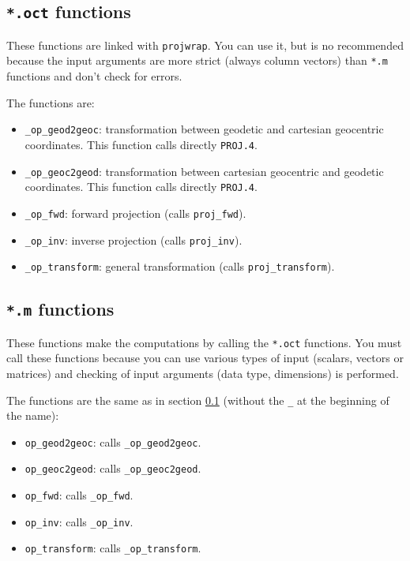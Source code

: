 \documentclass[10pt,a4paper]{article}
\newcommand{\proj}{\texttt{PROJ.4}}
\begin{document}
\subsection{\texttt{*.oct} functions}
\label{op-of}

These functions are linked with \texttt{projwrap}. You can use it, but is no
recommended because the input arguments are more strict (always column vectors)
than \texttt{*.m} functions and don't check for errors.

The functions are:
\begin{itemize}
\item \texttt{\_op\_geod2geoc}: transformation between geodetic and cartesian
      geocentric coordinates. This function calls directly \proj.
\item \texttt{\_op\_geoc2geod}: transformation between cartesian geocentric
      and geodetic coordinates. This function calls directly \proj.
\item \texttt{\_op\_fwd}: forward projection (calls \texttt{proj\_fwd}).
\item \texttt{\_op\_inv}: inverse projection (calls \texttt{proj\_inv}).
\item \texttt{\_op\_transform}: general transformation (calls
      \texttt{proj\_transform}).
\end{itemize}

\subsection{\texttt{*.m} functions}

These functions make the computations by calling the \texttt{*.oct} functions.
You must call these functions because you can use various types of input
(scalars, vectors or matrices) and checking of input arguments (data type,
dimensions) is performed.

The functions are the same as in section \ref{op-of} (without the \texttt{\_} at
the beginning of the name):
\begin{itemize}
\item \texttt{op\_geod2geoc}: calls \texttt{\_op\_geod2geoc}.
\item \texttt{op\_geoc2geod}: calls \texttt{\_op\_geoc2geod}.
\item \texttt{op\_fwd}: calls \texttt{\_op\_fwd}.
\item \texttt{op\_inv}: calls \texttt{\_op\_inv}.
\item \texttt{op\_transform}: calls \texttt{\_op\_transform}.
\end{itemize}
\end{document}
